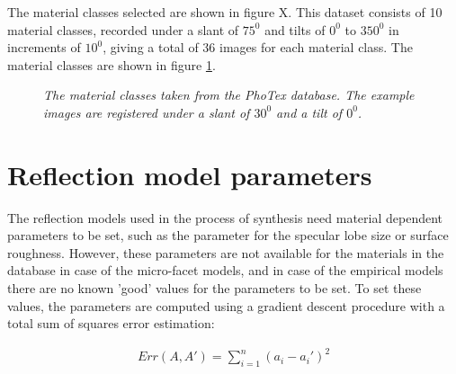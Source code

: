 The material classes selected are shown in figure X. This dataset consists of 10 material classes, recorded under a slant of $75^0$ and tilts of $0^0$ to $350^0$ in increments of $10^0$, giving a total of 36 images for each material class. The material classes are shown in figure \ref{fig:PhoTexData2}.

\begin{figure}[h]
	\begin{center}

	\end{center}
	\caption{{\it The material classes taken from the PhoTex database. The example images are registered under a slant of $30^0$ and a tilt of $0^0$.}}
	\label{fig:PhoTexData2}
\end{figure}

\section{Reflection model parameters}\label{sec:ParameterSetting}
The reflection models used in the process of synthesis need material dependent parameters to be set, such as the parameter for the specular lobe size or surface roughness. However, these parameters are not available for the materials in the database in case of the micro-facet models, and in case of the empirical models there are no known 'good' values for the parameters to be set. To set these values, the parameters are computed using a gradient descent procedure with a total sum of squares error estimation:

		\begin{eqnarray*}
			Err(A,A') = \sum_{i=1}^n (a_i - a_i')^2
		\end{eqnarray*}
 
